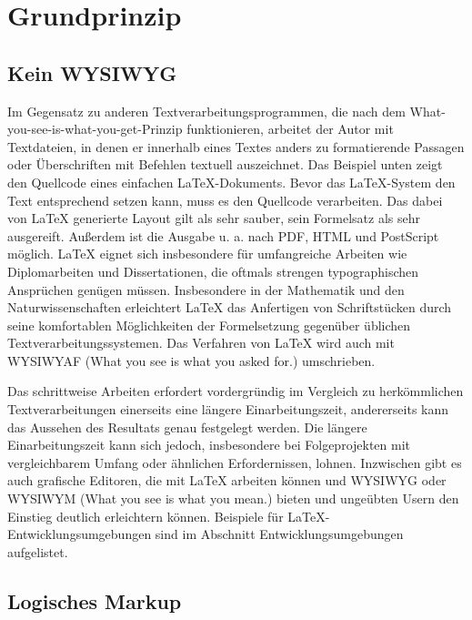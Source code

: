 
\section{Grundprinzip}
\label{chapter-basics}

\subsection{Kein WYSIWYG}

Im Gegensatz zu anderen Textverarbeitungsprogrammen, die nach dem What-you-see-is-what-you-get-Prinzip funktionieren, arbeitet der Autor mit Textdateien, in denen er innerhalb eines Textes anders zu formatierende Passagen oder Überschriften mit Befehlen textuell auszeichnet. Das Beispiel unten zeigt den Quellcode eines einfachen LaTeX-Dokuments. Bevor das LaTeX-System den Text entsprechend setzen kann, muss es den Quellcode verarbeiten. Das dabei von LaTeX generierte Layout gilt als sehr sauber, sein Formelsatz als sehr ausgereift. Außerdem ist die Ausgabe u. a. nach PDF, HTML und PostScript möglich. LaTeX eignet sich insbesondere für umfangreiche Arbeiten wie Diplomarbeiten und Dissertationen, die oftmals strengen typographischen Ansprüchen genügen müssen. Insbesondere in der Mathematik und den Naturwissenschaften erleichtert LaTeX das Anfertigen von Schriftstücken durch seine komfortablen Möglichkeiten der Formelsetzung gegenüber üblichen Textverarbeitungssystemen. Das Verfahren von LaTeX wird auch mit WYSIWYAF (What you see is what you asked for.) umschrieben.

Das schrittweise Arbeiten erfordert vordergründig im Vergleich zu herkömmlichen Textverarbeitungen einerseits eine längere Einarbeitungszeit, andererseits kann das Aussehen des Resultats genau festgelegt werden. Die längere Einarbeitungszeit kann sich jedoch, insbesondere bei Folgeprojekten mit vergleichbarem Umfang oder ähnlichen Erfordernissen, lohnen.\cite{Fenn} Inzwischen gibt es auch grafische Editoren, die mit LaTeX arbeiten können und WYSIWYG oder WYSIWYM (What you see is what you mean.) bieten und ungeübten Usern den Einstieg deutlich erleichtern können. Beispiele für LaTeX-Entwicklungsumgebungen sind im Abschnitt Entwicklungsumgebungen aufgelistet.

\subsection{Logisches Markup}

